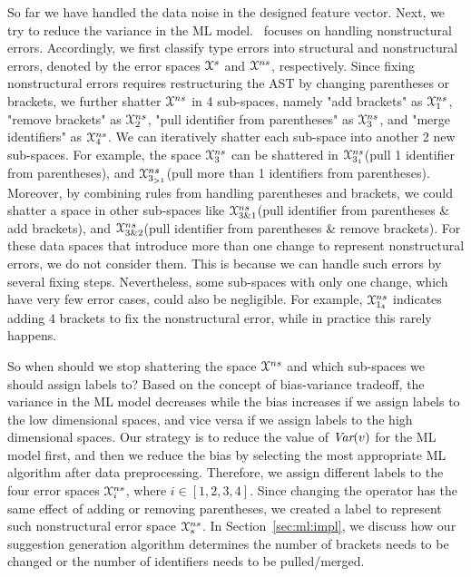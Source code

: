 \documentclass[12pt]{report}	%
\begin{document}
So far we have handled the data noise in the 
designed feature vector.
Next, we try to reduce the variance in the ML model.
\newCompiler\ focuses on handling nonstructural errors.
Accordingly, we first classify type errors into structural and nonstructural errors,
denoted by the error spaces $\mathcal{X}^{s}$ and $\mathcal{X}^{ns}$, respectively.
Since fixing nonstructural errors requires restructuring the AST by changing
parentheses or brackets, we further shatter $\mathcal{X}^{ns}$ in 4 sub-spaces,
namely "add brackets" as $\mathcal{X}^{ns}_{1}$, "remove brackets" as $\mathcal{X}^{ns}_{2}$,
"pull identifier from parentheses" as $\mathcal{X}^{ns}_{3}$,
and "merge identifiers" as $\mathcal{X}^{ns}_{4}$.
We can iteratively shatter each sub-space into another 2 new
sub-spaces. For example, the space $\mathcal{X}^{ns}_{3}$ can be
shattered in $\mathcal{X}^{ns}_{3_{1}}$(pull 1 identifier from parentheses), and
$\mathcal{X}^{ns}_{3_{>1}}$(pull more than 1 identifiers from parentheses).
Moreover, by combining rules from handling parentheses and brackets,
we could shatter a space in other sub-spaces 
like $\mathcal{X}^{ns}_{3\&1}$(pull identifier from parentheses \& add brackets),
and $\mathcal{X}^{ns}_{3\&2}$(pull identifier from parentheses \& remove brackets).
For these data spaces that introduce more than one change
to represent nonstructural errors,
we do not consider them.
This is because we can handle such errors by
several fixing steps.
%
Nevertheless,
some sub-spaces with only one change,
which have very few error cases,
could also be negligible.
For example, $\mathcal{X}^{ns}_{1_{4}}$ indicates adding 4 brackets to fix the nonstructural error,
while in practice this rarely happens.

So when should we stop shattering the space $\mathcal{X}^{ns}$ and which sub-spaces we should
assign labels to? Based on the concept of bias-variance tradeoff,
the variance in the ML model decreases while the bias increases
if we assign labels to the low dimensional spaces,
and vice versa if we assign labels to the high dimensional spaces. 
Our strategy is to reduce the value of $\textit{Var}(v)$ for the ML model first,
and then we reduce the bias by selecting 
the most appropriate ML algorithm after data preprocessing.
Therefore, we assign different labels to
the four error spaces $\mathcal{X}^{ns}_{i}$,
where $i \in [1,2,3,4]$.
Since changing the operator \prog{\$}
has the same effect of adding or removing 
parentheses, 
we created a label to represent such nonstructural error space $\mathcal{X}^{ns}_{s}$.
In Section~\ref{sec:ml:impl},
we discuss how our suggestion
generation algorithm determines the number of brackets needs to be changed
or the number of identifiers needs to be pulled/merged.
\end{document}
